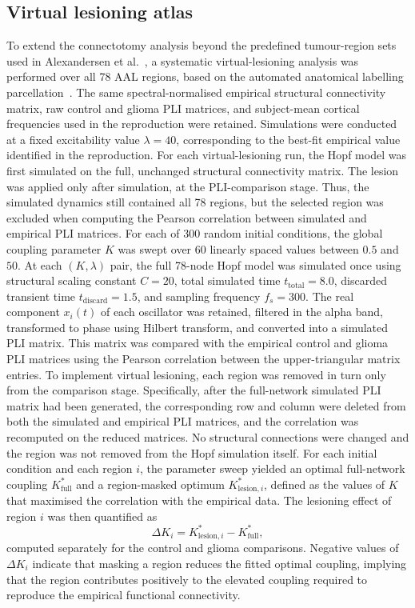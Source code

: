 \documentclass[11pt, reprint, aps, prl, floatfix, secnumarabic]{revtex4-2}
\begin{document}
\subsection{Virtual lesioning atlas}\label{sec:vla_methods}
To extend the connectotomy analysis beyond the predefined tumour-region sets used in Alexandersen et al.~\cite{Alexandersen2025}, a systematic virtual-lesioning analysis was performed over all 78 AAL regions, based on the automated anatomical labelling parcellation~\cite{TzourioMazoyer2002}. The same spectral-normalised empirical structural connectivity matrix, raw control and glioma PLI matrices, and subject-mean cortical frequencies used in the reproduction were retained. Simulations were conducted at a fixed excitability value $\lambda = 40$, corresponding to the best-fit empirical value identified in the reproduction. For each virtual-lesioning run, the Hopf model was first simulated on the full, unchanged structural connectivity matrix. The lesion was applied only after simulation, at the PLI-comparison stage. Thus, the simulated dynamics still contained all 78 regions, but the selected region was excluded when computing the Pearson correlation between simulated and empirical PLI matrices.
For each of 300 random initial conditions, the global coupling parameter $K$ was swept over 60 linearly spaced values between $0.5$ and $50$. At each $(K,\lambda)$ pair, the full 78-node Hopf model was simulated once using structural scaling constant $C=20$, total simulated time $t_{\mathrm{total}}=8.0$, discarded transient time $t_{\mathrm{discard}}=1.5$, and sampling frequency $f_s = 300$. The real component \(x_i(t)\) of each oscillator was retained, filtered in the alpha band, transformed to phase using Hilbert transform, and converted into a simulated PLI matrix. This matrix was compared with the empirical control and glioma PLI matrices using the Pearson correlation between the upper-triangular matrix entries. To implement virtual lesioning, each region was removed in turn only from the comparison stage. Specifically, after the full-network simulated PLI matrix had been generated, the corresponding row and column were deleted from both the simulated and empirical PLI matrices, and the correlation was recomputed on the reduced matrices. No structural connections were changed and the region was not removed from the Hopf simulation itself.
For each initial condition and each region $i$, the parameter sweep yielded an optimal full-network coupling $K_{\mathrm{full}}^{*}$ and a region-masked optimum $K_{\mathrm{lesion},i}^{*}$, defined as the values of $K$ that maximised the correlation with the empirical data. The lesioning effect of region $i$ was then quantified as
\begin{equation}
\Delta K_i = K_{\mathrm{lesion},i}^{*} - K_{\mathrm{full}}^{*},
\end{equation}
computed separately for the control and glioma comparisons. Negative values of $\Delta K_i$ indicate that masking a region reduces the fitted optimal coupling, implying that the region contributes positively to the elevated coupling required to reproduce the empirical functional connectivity. 
\end{document}
